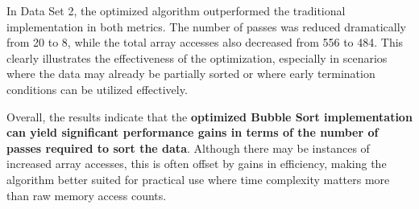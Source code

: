 In Data Set 2, the optimized algorithm outperformed the traditional implementation in both metrics. The number of passes was reduced dramatically from 20 to 8, while the total array accesses also decreased from 556 to 484. This clearly illustrates the effectiveness of the optimization, especially in scenarios where the data may already be partially sorted or where early termination conditions can be utilized effectively.

Overall, the results indicate that the \textbf{optimized Bubble Sort implementation can yield significant performance gains in terms of the number of passes required to sort the data}. Although there may be instances of increased array accesses, this is often offset by gains in efficiency, making the algorithm better suited for practical use where time complexity matters more than raw memory access counts.




